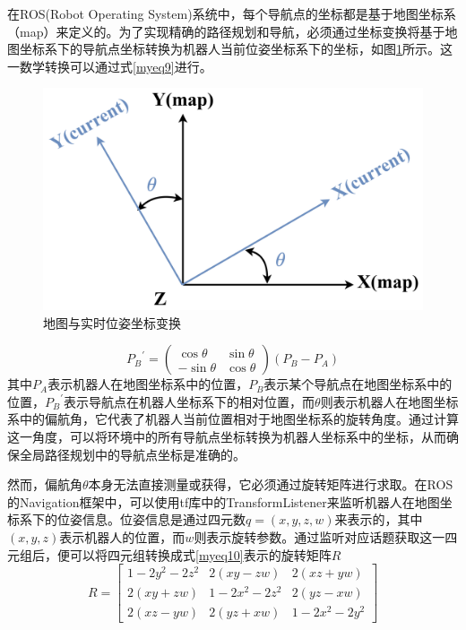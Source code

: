 在ROS(Robot Operating System)系统中，每个导航点的坐标都是基于地图坐标系（map）来定义的。为了实现精确的路径规划和导航，必须通过坐标变换将基于地图坐标系下的导航点坐标转换为机器人当前位姿坐标系下的坐标，如图\ref{axis_transform}所示。这一数学转换可以通过式\eqref{myeq9}进行。
\begin{figure}[htbp]
    \centering
    \includegraphics[scale=0.06]{Fig/axis_transform.png}
    \caption{\label{axis_transform}地图与实时位姿坐标变换}
\end{figure}
\begin{equation}
{P_B}^\prime  = \left( {\begin{array}{*{20}{c}}
{\cos \theta }&{\sin \theta }\\
{ - \sin \theta }&{\cos \theta }
\end{array}} \right)\left( {{P_B} - {P_A}} \right)
\label{myeq9}
\end{equation}
其中${{P_A}}$表示机器人在地图坐标系中的位置，${{P_B}}$表示某个导航点在地图坐标系中的位置，${P_B}^\prime$表示导航点在机器人坐标系下的相对位置，而$\theta$则表示机器人在地图坐标系中的偏航角，它代表了机器人当前位置相对于地图坐标系的旋转角度。通过计算这一角度，可以将环境中的所有导航点坐标转换为机器人坐标系中的坐标，从而确保全局路径规划中的导航点坐标是准确的。

然而，偏航角$\theta$本身无法直接测量或获得，它必须通过旋转矩阵进行求取。在ROS的Navigation框架中，可以使用tf库中的TransformListener来监听机器人在地图坐标系下的位姿信息。位姿信息是通过四元数$q = (x, y, z, w)$来表示的，其中$(x, y, z)$表示机器人的位置，而$w$则表示旋转参数。通过监听对应话题获取这一四元组后，便可以将四元组转换成式\ref{myeq10}表示的旋转矩阵$R$
\begin{equation}
	R = \left[ {\begin{array}{*{20}{c}}
		{1 - 2{y^2} - 2{z^2}}&{2\left( {xy - zw} \right)}&{2\left( {xz + yw} \right)}\\
		{2\left( {xy + zw} \right)}&{1 - 2{x^2} - 2{z^2}}&{2\left( {yz - xw} \right)}\\
		{2\left( {xz - yw} \right)}&{2\left( {yz + xw} \right)}&{1 - 2{x^2} - 2{y^2}}
		\end{array}} \right]
	\label{myeq10}
\end{equation}

